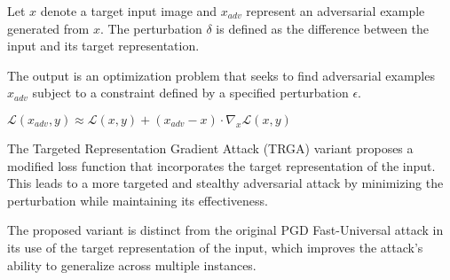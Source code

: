 Let $x$ denote a target input image and $x_{adv}$ represent an adversarial example generated from $x$. The perturbation $\delta$ is defined as the difference between the input and its target representation.

The output is an optimization problem that seeks to find adversarial examples $x_{adv}$ subject to a constraint defined by a specified perturbation $\epsilon$.

$\mathcal{L}(x_{adv}, y) \approx \mathcal{L}(x, y) + (x_{adv} - x) \cdot \nabla_x \mathcal{L}(x, y)$

The Targeted Representation Gradient Attack (TRGA) variant proposes a modified loss function that incorporates the target representation of the input. This leads to a more targeted and stealthy adversarial attack by minimizing the perturbation while maintaining its effectiveness.

The proposed variant is distinct from the original PGD Fast-Universal attack in its use of the target representation of the input, which improves the attack's ability to generalize across multiple instances.